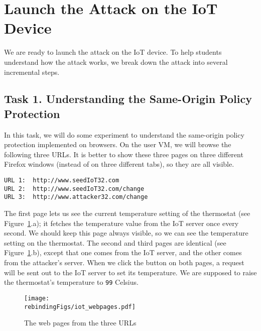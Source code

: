 \section{Launch the Attack on the IoT Device}

We are ready to launch the attack on the IoT device. To help students 
understand how the attack works, we break down
the attack into several incremental steps. 


\subsection{Task 1. Understanding the Same-Origin Policy Protection}

In this task, we will do some experiment to understand the 
same-origin policy protection implemented on browsers. On the user VM,
we will browse the following three URLs. It is better to show these three pages on three
different Firefox windows (instead of on three different tabs), so they are all visible. 


\begin{lstlisting}
URL 1:  http://www.seedIoT32.com
URL 2:  http://www.seedIoT32.com/change
URL 3:  http://www.attacker32.com/change
\end{lstlisting}

 
The first page lets us see the current temperature setting of the thermostat (see
Figure~\ref{rebinding:fig:webpages}.a); it fetches
the temperature value from the IoT server once every second. We should keep this page always
visible, so we can see the temperature setting on the thermostat. 
The second and third pages
are identical (see Figure~\ref{rebinding:fig:webpages}.b), 
except that one comes from the IoT server, and the other comes from
the attacker's server. When we click the button on both pages, 
a request will be sent out to the IoT server to set its temperature. 
We are supposed to raise the thermostat's temperature 
to \texttt{99} Celsius.  


\begin{figure}[htb]
\begin{center}
\texttt{[image: \\rebindingFigs/iot\_webpages.pdf]}
\end{center}
\caption{The web pages from the three URLs}
\label{rebinding:fig:webpages}
\end{figure}
 


